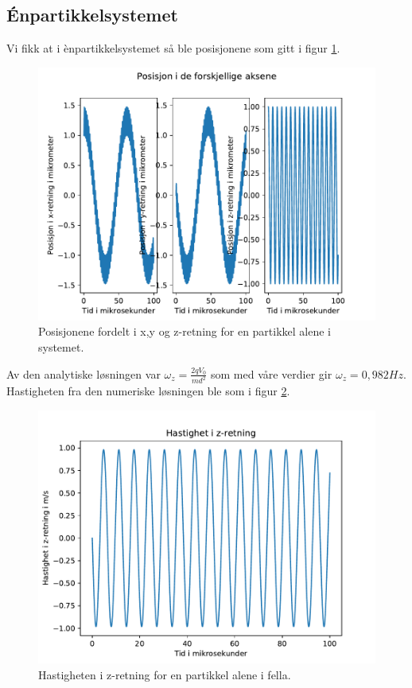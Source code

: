 \documentclass[reprint,english,notitlepage]{revtex4-1}  %
\begin{document}
\subsection*{Énpartikkelsystemet}
Vi fikk at i ènpartikkelsystemet så ble posisjonene som gitt i figur \ref{r1pos}.
\begin{figure}
	\label{r1pos}
	\centering 
	\includegraphics[scale=0.4]{../pythonplots/r1pos.pdf}
	\caption{Posisjonene fordelt i x,y og z-retning for en partikkel alene i systemet.}
\end{figure}
Av den analytiske løsningen var $\omega_z=\frac{2qV_0}{md^2}$ som med våre verdier gir $\omega_z=0,982Hz$.
Hastigheten fra den numeriske løsningen ble som i figur \ref{v1z}.
\begin{figure}
	\label{v1z}
	\centering 
	\includegraphics[scale=0.4]{../pythonplots/vz.pdf}
	\caption{Hastigheten i z-retning for en partikkel alene i fella.}
\end{figure}
\end{document}
